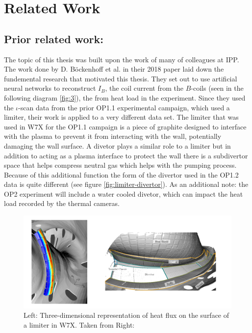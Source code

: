 %
\chapter{Related Work}
\label{sec:related}

\section{Prior related work: }

The topic of this thesis was built upon the work of many of colleagues at IPP. The work done by D. Böckenhoff et al. in their 2018 paper \cite{Böckenhoff_2018} laid down the fundemental research that motivated this thesis. They set out to use artificial neural networks to reconstruct $I_B$, the coil current from the $B$-coils (seen in the following diagram \ref{fig:3}), the from heat load in the experiment. Since they used the $\iota$-scan data from the prior OP1.1 experimental campaign, which used a limiter, their work is applied to a very different data set. The limiter that was used in W7X for the OP1.1 campaign is a piece of graphite designed to interface with the plasma to prevent it from interacting with the wall, potentially damaging the wall surface. A divetor plays a similar role to a limiter but in addition to acting as a plasma interface to protect the wall there is a subdivertor space that helps compress neutral gas which helps with the pumping process. Because of this additional function the form of the divertor used in the OP1.2 data is quite different (see figure \ref{fig:limiter-divertor}). As an additional note: the OP2 experiment will include a water cooled divetor, which can impact the heat load recorded by the thermal cameras.

\begin{figure}[!htb]
    \centering
    \includegraphics[width = \textwidth]{images/limiter-divetor.png}
    \caption{Left: Three-dimensional representation of heat flux on the surface of a limiter in W7X. Taken from \cite{Böckenhoff_2018} Right: } \label{fig:limiter-divetor}
\end{figure}

